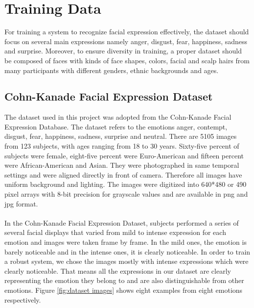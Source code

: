 \section{Training Data}


For training a system to recognize facial expression effectively, the dataset should focus on several main expressions namely anger, disgust, fear, happiness, sadness and surprise. Moreover, to ensure diversity in training, a proper dataset should be composed of faces with kinds of face shapes, colors, facial and scalp hairs from many participants with different genders, ethnic backgrounds and ages.


\subsection{Cohn-Kanade Facial Expression Dataset}
\nocite{Kanade2000CK+}\nocite{Lucey2010CK+}

The dataset used in this project was adopted from the Cohn-Kanade Facial Expression Database. The dataset refers to the emotions anger, contempt, disgust, fear, happiness, sadness, surprise and neutral. There are 5105 images from 123 subjects, with ages ranging from 18 to 30 years. Sixty-five percent of subjects were female, eight-five percent were Euro-American and fifteen percent were African-American and Asian. They were photographed in same temporal settings and were aligned directly in front of camera. Therefore all images have uniform background and lighting. The images were digitized into 640*480 or 490 pixel arrays with 8-bit precision for grayscale values and are available in png and jpg format.
\\
\\
In the Cohn-Kanade Facial Expression Dataset, subjects performed a series of several facial displays that varied from mild to intense expression for each emotion and images were taken frame by frame.  In the mild ones, the emotion is barely noticeable and in the intense ones, it is clearly noticeable. In order to train a robust system, we chose the images mostly with intense expressions which were clearly noticeable. That means all the expressions in our dataset are clearly representing the emotion they belong to and are also distinguishable from other emotions. Figure \ref{fig:dataset images} shows eight examples from eight emotions respectively.


